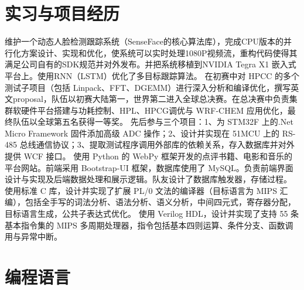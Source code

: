 \documentclass[11pt,a4paper]{moderncv}
\begin{document}
\section{实习与项目经历}
{维护一个动态人脸检测跟踪系统（SenseFace的核心算法库），完成CPU版本的并行化方案设计、实现和优化，使系统可以实时处理1080P视频流，重构代码使得其满足公司自有的SDK规范并对外发布。并把系统移植到NVIDIA Tegra X1 嵌入式平台上。使用RNN（LSTM）优化了多目标跟踪算法。}  
{在初赛中对 HPCC 的多个测试子项目（包括 Linpack、FFT、DGEMM）进行深入分析和编译优化，撰写英文proposal，队伍以初赛大陆第一，世界第二进入全球总决赛。在总决赛中负责集群软硬件平台搭建与功耗控制、HPL、HPCG调优与 WRF-CHEM 应用优化，最终队伍以全球第五名获得一等奖。} 
{先后参与三个项目：1、为 STM32F 上的.Net Micro Framework 固件添加高级 ADC 操作；2、设计并实现在 51MCU 上的 RS-485 总线通信协议；3、提取测试程序调用外部库的依赖关系，存入数据库并对外提供 WCF 接口。} 
{使用 Python 的 WebPy 框架开发的点评书籍、电影和音乐的平台网站。前端采用 Bootstrap-UI 框架，数据库使用了 MySQL。负责前端界面设计与实现及后端数据处理和展示逻辑。队友设计了数据库触发器，存储过程。} 
{使用标准 C 库，设计并实现了扩展 PL/0 文法的编译器（目标语言为 MIPS 汇编），包括全手写的词法分析、语法分析、语义分析，中间四元式，寄存器分配，目标语言生成，公共子表达式优化。} 
{使用 Verilog HDL，设计并实现了支持 55 条基本指令集的 MIPS 多周期处理器，指令包括基本四则运算、条件分支、函数调用与异常中断。} 
\section{编程语言}
\end{document}
